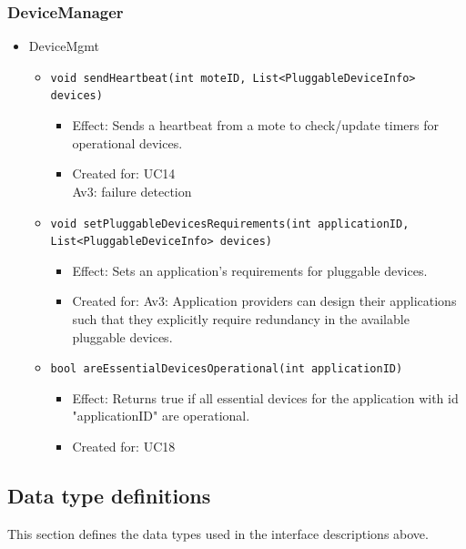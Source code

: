     \subsubsection{DeviceManager}
        \begin{itemize}
        	\item DeviceMgmt
        	\begin{itemize}
        		\item \texttt{void sendHeartbeat(int moteID, List<PluggableDeviceInfo> devices)}
        		\begin{itemize}
        			\item Effect: Sends a heartbeat from a mote to check/update timers for operational devices.
        			\item Created for: UC14 \\
                          Av3: failure detection
        		\end{itemize}
                \item \texttt{void setPluggableDevicesRequirements(int applicationID, List<PluggableDeviceInfo> devices)}
                \begin{itemize}
                    \item Effect: Sets an application's requirements for pluggable devices.
                    \item Created for: Av3: Application providers can design their applications
                          such that they explicitly require redundancy in
                          the available pluggable devices.
                \end{itemize}
        		\item \texttt{bool areEssentialDevicesOperational(int applicationID)}
        		\begin{itemize}
        			\item Effect: Returns true if all essential devices for the application
                                  with id "applicationID" are operational.
        			\item Created for: UC18
        		\end{itemize}
        	\end{itemize}
        \end{itemize}


\subsection{Data type definitions}
    This section defines the data types used in the interface descriptions above.

